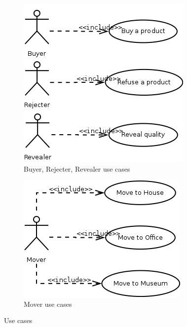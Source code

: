 \documentclass[a4paper,11pt]{report}
\begin{document}
\begin{figure}[ht!]
    \begin{subfigure}{0.5\textwidth}
       \includegraphics[width=\textwidth]{media/use_cases_3.png}
       \caption{Buyer, Rejecter, Revealer use cases}
       \label{figure:use_cases_3}
    \end{subfigure}
    \begin{subfigure}{0.5\textwidth}
       \includegraphics[width=\textwidth]{media/use_cases_4.png}
       \caption{Mover use cases}
       \label{figure:use_cases_4}
    \end{subfigure}

    \caption{Use cases}
    \label{figure:use_cases}
  \end{figure}
\end{document}
